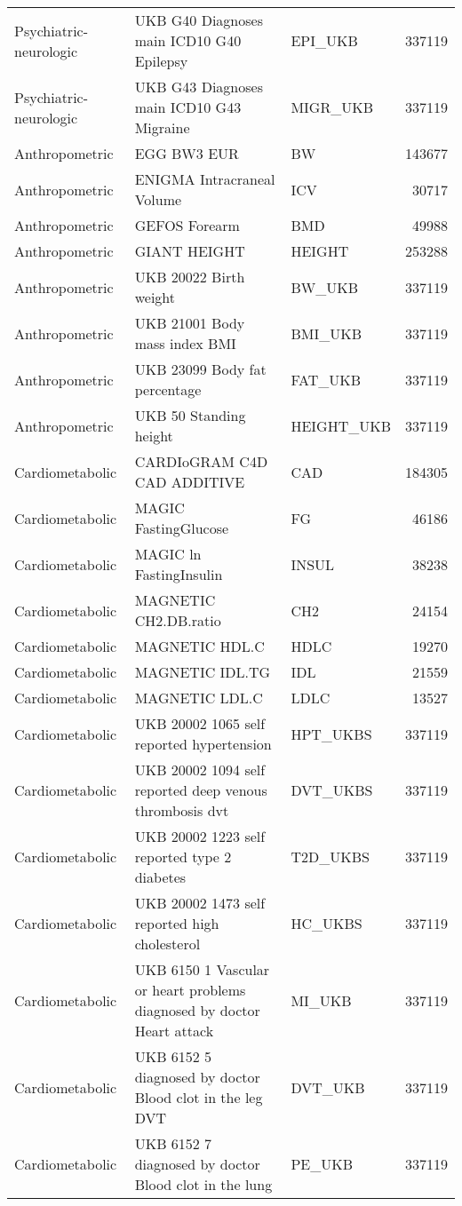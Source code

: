 \begin{table}[ht]
\begin{tabular}{lllr}
  Psychiatric-neurologic & UKB G40 Diagnoses main ICD10 G40 Epilepsy & EPI\_UKB & 337119 \\ 
  Psychiatric-neurologic & UKB G43 Diagnoses main ICD10 G43 Migraine & MIGR\_UKB & 337119 \\ 
  Anthropometric & EGG BW3 EUR & BW & 143677 \\ 
  Anthropometric & ENIGMA Intracraneal Volume & ICV & 30717 \\ 
  Anthropometric & GEFOS Forearm & BMD & 49988 \\ 
  Anthropometric & GIANT HEIGHT & HEIGHT & 253288 \\ 
  Anthropometric & UKB 20022 Birth weight & BW\_UKB & 337119 \\ 
  Anthropometric & UKB 21001 Body mass index BMI & BMI\_UKB & 337119 \\ 
  Anthropometric & UKB 23099 Body fat percentage & FAT\_UKB & 337119 \\ 
  Anthropometric & UKB 50 Standing height & HEIGHT\_UKB & 337119 \\ 
  Cardiometabolic & CARDIoGRAM C4D CAD ADDITIVE & CAD & 184305 \\ 
  Cardiometabolic & MAGIC FastingGlucose & FG & 46186 \\ 
  Cardiometabolic & MAGIC ln FastingInsulin & INSUL & 38238 \\ 
  Cardiometabolic & MAGNETIC CH2.DB.ratio & CH2 & 24154 \\ 
  Cardiometabolic & MAGNETIC HDL.C & HDLC & 19270 \\ 
  Cardiometabolic & MAGNETIC IDL.TG & IDL & 21559 \\ 
  Cardiometabolic & MAGNETIC LDL.C & LDLC & 13527 \\ 
  Cardiometabolic & UKB 20002 1065 self reported hypertension & HPT\_UKBS & 337119 \\ 
  Cardiometabolic & UKB 20002 1094 self reported deep venous thrombosis dvt & DVT\_UKBS & 337119 \\ 
  Cardiometabolic & UKB 20002 1223 self reported type 2 diabetes & T2D\_UKBS & 337119 \\ 
  Cardiometabolic & UKB 20002 1473 self reported high cholesterol & HC\_UKBS & 337119 \\ 
  Cardiometabolic & UKB 6150 1 Vascular or heart problems diagnosed by doctor Heart attack & MI\_UKB & 337119 \\ 
  Cardiometabolic & UKB 6152 5 diagnosed by doctor Blood clot in the leg DVT & DVT\_UKB & 337119 \\ 
  Cardiometabolic & UKB 6152 7 diagnosed by doctor Blood clot in the lung & PE\_UKB & 337119 \\ 

\end{tabular}
\end{table}
